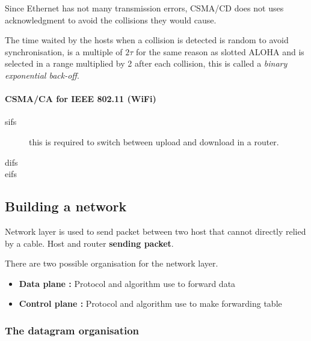 Since Ethernet has not many transmission errors, CSMA/CD does not uses acknowledgment to avoid the collisions they would cause.

The time waited by the hosts when a collision is detected is random to avoid synchronisation,
is a multiple of $2\tau$ for the same reason as slotted ALOHA and is selected in a range multiplied by 2 after each collision,
this is called a \emph{binary exponential back-off}.

\paragraph{CSMA/CA for IEEE 802.11 (WiFi)}

\begin{description}
  \item[sifs] this is required to switch between upload and download in a router.
  \item[difs]
  \item[eifs]
\end{description}

%
%



\subsection{Building a network}
Network layer is used to send packet between two host that cannot directly relied
by a cable. Host and router \textbf{sending packet}.

There are two possible organisation for the network layer.

\begin{itemize}
    \item \textbf{Data plane :} Protocol and algorithm use to forward data
    \item \textbf{Control plane :} Protocol and algorithm use to make forwarding table
\end{itemize}

\subsubsection{The datagram organisation}

